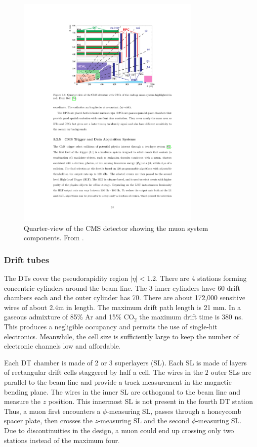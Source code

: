 \begin{figure}[hbtp]
\centering
\includegraphics[width=0.8\textwidth]{figures/cms_muon_systems.pdf}
\caption{
Quarter-view of the CMS detector showing the muon system components. 
From \cite{Chatrchyan:2008aa}.
}
\label{fig:muonsystem}
\end{figure}

\subsubsection{Drift tubes}
The DTs cover the pseudorapidity region $|\eta|<1.2$.
There are 4 stations forming concentric cylinders around the beam line.
The 3 inner cylinders have 60 drift chambers each and the outer cylinder has 70.
There are about 172,000 sensitive wires of about 2.4m in length.
The maximum drift path length is 21 mm. In a gaseous admixture of 85\% Ar and 15\% $\mathrm{CO}_2$ the maximum drift time is 380 ns.
This produces a negligible occupancy and permits the use of single-hit electronics.
Meanwhile, the cell size is sufficiently large to keep the number of electronic channels low and affordable.

Each DT chamber is made of 2 or 3 superlayers (SL).
Each SL is made of layers of rectangular drift cells staggered by half a cell.
The wires in the 2 outer SLs are parallel to the beam line and provide a track measurement
in the magnetic bending plane. 
The wires in the inner SL are orthogonal to the beam line and measure the $z$ position.
This innermost SL is not present in the fourth DT station
Thus, a muon first encounters a $\phi$-measuring SL, passes through a honeycomb spacer plate,
then crosses the $z$-measuring SL and the second $\phi$-measuring SL.
Due to discontinuities in the design,
a muon could end up crossing only two stations instead of the maximum four.

